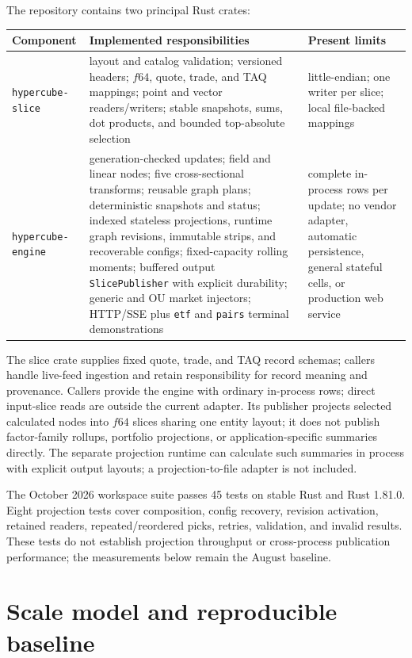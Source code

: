 \documentclass{strategynet-journal}
\begin{document}
The repository contains two principal Rust crates:
\begin{center}
\begin{tabularx}{\textwidth}{@{}p{}X X@{}}
\toprule
Component & Implemented responsibilities & Present limits \\
\midrule
\texttt{hypercube-slice} &
layout and catalog validation; versioned headers; \(f64\), quote, trade, and
TAQ mappings; point and vector readers/writers; stable snapshots, sums, dot
products, and bounded top-absolute selection &
little-endian; one writer per slice; local file-backed mappings \\
\texttt{hypercube-engine} &
generation-checked updates; field and linear nodes; five cross-sectional
transforms; reusable graph plans; deterministic snapshots and status;
indexed stateless projections, runtime graph revisions, immutable strips,
and recoverable configs;
fixed-capacity rolling moments; buffered output \texttt{SlicePublisher} with
explicit durability; generic and OU market injectors; HTTP/SSE plus
\texttt{etf} and \texttt{pairs} terminal demonstrations &
complete in-process rows per update; no vendor adapter, automatic persistence,
general stateful cells, or production web service \\
\bottomrule
\end{tabularx}
\end{center}

The slice crate supplies fixed quote, trade, and TAQ record schemas; callers
handle live-feed ingestion and retain responsibility for record meaning and
provenance.  Callers provide the engine with ordinary in-process rows; direct
input-slice reads are outside the current adapter.  Its publisher projects
selected calculated nodes into
\(f64\) slices sharing one entity layout; it does not publish factor-family
rollups, portfolio projections, or application-specific summaries directly.
The separate projection runtime can calculate such summaries in process with
explicit output layouts; a projection-to-file adapter is not included.

The October 2026 workspace suite passes 45 tests on stable Rust and Rust 1.81.0.
Eight projection tests cover composition, config recovery, revision activation,
retained readers, repeated/reordered picks, retries, validation, and invalid
results.  These tests do not establish projection throughput or cross-process
publication performance; the measurements below remain the August baseline.

\section{Scale model and reproducible baseline}
\end{document}
